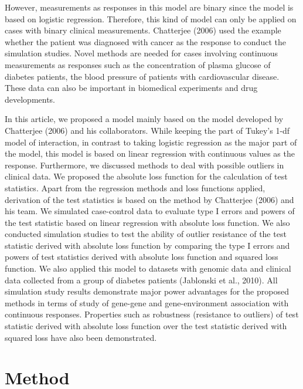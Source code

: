 \documentclass[12pt]{article}
\begin{document}
However, measurements as responses in this model are binary since the model is based on logistic regression. Therefore, this kind of model can only be applied on cases with binary clinical measurements. Chatterjee (2006) used the example whether the patient was diagnosed with cancer as the response to conduct the simulation studies. Novel methods are needed for cases involving continuous measurements as responses such as the concentration of plasma glucose of diabetes patients, the blood pressure of patients with cardiovascular disease. These data can also be important in biomedical experiments and drug developments.

In this article, we proposed a model mainly based on the model developed by Chatterjee (2006) and his collaborators. While keeping the part of Tukey’s 1-df model of interaction, in contrast to taking logistic regression as the major part of the model, this model is based on linear regression with continuous values as the response. Furthermore, we discussed methods to deal with possible outliers in clinical data. We proposed the absolute loss function for the calculation of test statistics. Apart from the regression methods and loss functions applied, derivation of the test statistics is based on the method by Chatterjee (2006) and his team. We simulated case-control data to evaluate type I errors and powers of the test statistic based on linear regression with absolute loss function. We also conducted simulation studies to test the ability of outlier resistance of the test statistic derived with absolute loss function by comparing the type I errors and powers of test statistics derived with absolute loss function and squared loss function. We also applied this model to datasets with genomic data and clinical data collected from a group of diabetes patients (Jablonski et al., 2010). All simulation study results demonstrate major power advantages for the proposed methods in terms of study of gene-gene and gene-environment association with continuous responses. Properties such as robustness (resistance to outliers) of test statistic derived with absolute loss function over the test statistic derived with squared loss have also been demonstrated.

\section{Method}
\end{document}
